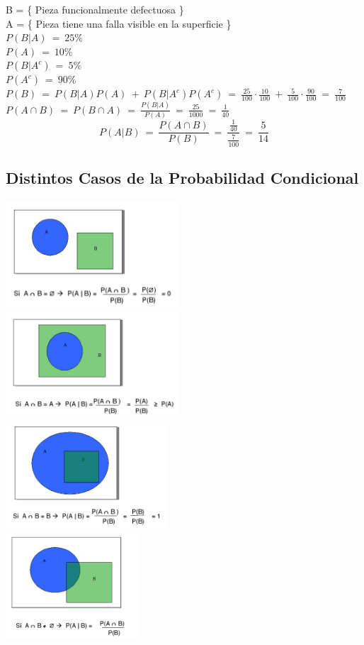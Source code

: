 	B = \{ Pieza funcionalmente defectuosa \}\\
	A = \{ Pieza tiene una falla visible en la superficie \}\\
	$P(B|A)\ =\ 25\%$\\
	$P(A)\ =\ 10\%$\\
	$P(B|A^{c})\ =\ 5\%$\\
	$P(A^{c})\ =\ 90\%$\\
	$P(B)\ =\ P(B|A)P(A)\ +\ P(B|A^{c})P(A^{c})\ =\ \frac{25}{100}\cdot \frac{10}{100}\ +\ \frac{5}{100}\cdot \frac{90}{100}\ =\ \frac{7}{100}$\\
	$P(A\cap B)\ =\ P(B\cap A)\ =\ \frac{P(B|A)}{P(A)}\ =\ \frac{25}{1000}\ =\ \frac{1}{40}$\\
	$$P(A|B)\ =\ \frac{P(A\cap B)}{P(B)}\ =\ \frac{\frac{1}{40}}{\frac{7}{100}}\ =\ \frac{5}{14}$$
\subsection{Distintos Casos de la Probabilidad Condicional}
	\begin{center}
		\includegraphics[height=4cm]{images/cap6_1}\\
		\includegraphics[height=4cm]{images/cap6_2}\\
		\includegraphics[height=4cm]{images/cap6_3}\\
		\includegraphics[height=4cm]{images/cap6_4}
	\end{center}
